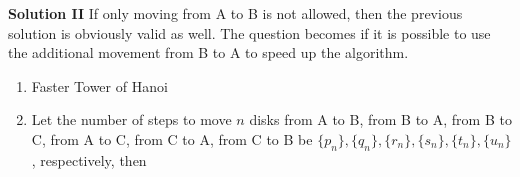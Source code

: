\documentclass{../../cls/sig-alternate-05-2015}
\begin{document}
\textbf{Solution II}
If only moving from A to B is not allowed, then the previous solution is obviously valid as well.
The question becomes if it is possible to use the additional movement from B to A to speed up the algorithm.
\begin{enumerate}[label=(\alph*)]
    \item \begin{algorithm}[H]
        \caption{Faster Tower of Hanoi}
        \label{a:5-2}
        \begin{algorithmic}
            \State \Return
            \Else
            \State {}
            \State {}
            \State {}
            \State {}
            \State {}
            \EndIf
            \EndProcedure
            \State \Return
            \Else
            \State {}
            \State {}
            \State {}
            \EndIf
            \EndProcedure
            \State \Return
            \Else
            \State {}
            \State {}
            \State {}
            \EndIf
            \EndProcedure
            \State \Return
            \Else
            \State {}
            \State {}
            \State {}
            \EndIf
            \EndProcedure
            \State \Return
            \Else
            \State {}
            \State {}
            \State {}
            \EndIf
            \EndProcedure
            \State \Return
            \Else
            \State {}
            \State {}
            \State {}
            \EndIf
            \EndProcedure
        \end{algorithmic}
    \end{algorithm}
    \item Let the number of steps to move $n$ disks from A to B, from B to A, from B to C, from A to C, from C to A, from C to B be $\{p_n\}, \{q_n\}, \{r_n\}, \{s_n\}, \{t_n\}, \{u_n\}$, respectively, then \begin{align}

\end{align}
\end{enumerate}
\end{document}

